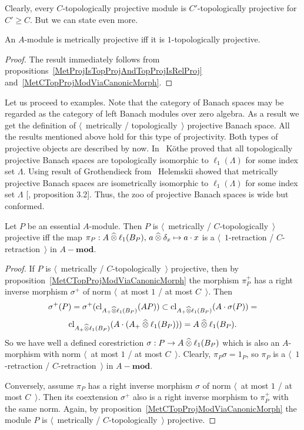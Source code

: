 Clearly, every $C$-topologically projective module is $C'$-topologically 
projective for $C'\geq C$. But we can state even more.

\begin{proposition}\label{MetProjIsOneTopProj} An $A$-module is metrically
projective iff it is $1$-topologically projective.
\end{proposition}
\begin{proof} The result immediately follows 
from propositions~\ref{MetProjIsTopProjAndTopProjIsRelProj} 
and~\ref{MetCTopProjModViaCanonicMorph}.
\end{proof}


Let us proceed to examples. Note that the category of Banach spaces may be
regarded as the category of left Banach modules over zero algebra. As a
result we get the definition of $\langle$~metrically / topologically~$\rangle$
projective Banach space. All the results mentioned above hold for this type of
projectivity. Both types of projective objects are described by now.
In~\cite{KotheTopProjBanSp} K{\"o}the proved that all topologically projective
Banach spaces are topologically isomorphic to $\ell_1(\Lambda)$ for some index
set $\Lambda$. Using result of Grothendieck from~\cite{GrothMetrProjFlatBanSp}
Helemskii showed that metrically projective Banach spaces are isometrically
isomorphic to $\ell_1(\Lambda)$ for some index set $\Lambda$
[\cite{HelMetrFrQMod}, proposition 3.2]. Thus, the zoo of projective Banach
spaces is wide but conformed.

\begin{proposition}\label{NonDegenMetTopProjCharac}  Let $P$ be an essential
$A$-module. Then $P$ is $\langle$~metrically / $C$-topologically~$\rangle$
projective iff the map 
$\pi_P:A\mathbin{\widehat{\otimes}}\ell_1(B_P),\, a\mathbin{\widehat{\otimes}}\delta_x\mapsto a\cdot x$ 
is a $\langle$~$1$-retraction / $C$-retraction~$\rangle$ in $A-\mathbf{mod}$.
\end{proposition} 
\begin{proof}
If $P$ is $\langle$~metrically / $C$-topologically~$\rangle$ projective, then by
proposition~\ref{MetCTopProjModViaCanonicMorph} the morphism 
$\pi_P^+$ has a right inverse morphism $\sigma^+$ of norm 
$\langle$~at most $1$ / at most $C$~$\rangle$. Then 
$$
\sigma^+(P)
=\sigma^+(\operatorname{cl}_{A_+\mathbin{\widehat{\otimes}}\ell_1(B_P)}(AP))
\subset \operatorname{cl}_{A_+\mathbin{\widehat{\otimes}}\ell_1(B_P)}(A\cdot\sigma(P))=
$$
$$
\operatorname{cl}_{A_+\mathbin{\widehat{\otimes}}\ell_1(B_P)}(A\cdot(A_+\mathbin{\widehat{\otimes}}\ell_1(B_P)))
=A\mathbin{\widehat{\otimes}}\ell_1(B_P).
$$ 
So we have well a defined corestriction $\sigma:P\to A\mathbin{\widehat{\otimes}}\ell_1(B_P)$
which is also an $A$-morphism with norm $\langle$~at most $1$ / at most
$C$~$\rangle$. Clearly, $\pi_P\sigma=1_P$, so $\pi_P$ is a
$\langle$~$1$-retraction / $C$-retraction~$\rangle$ in $A-\mathbf{mod}$.

Conversely, assume $\pi_P$ has a right inverse morphism $\sigma$ of norm
$\langle$~at most $1$ / at most $C$~$\rangle$. Then its coextension $\sigma^+$
also is a right inverse morphism to $\pi_P^+$ with the same norm. Again, by
proposition~\ref{MetCTopProjModViaCanonicMorph} the module $P$ is
$\langle$~metrically / $C$-topologically~$\rangle$ projective. 
\end{proof}

